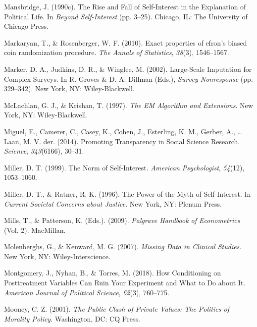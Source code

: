 \documentclass[12pt,econ]{sources/authesis}
\begin{document}
\leavevmode\hypertarget{ref-mansbridge_rise_1990}{}%
Mansbridge, J. (1990c). The Rise and Fall of Self-Interest in the Explanation of Political Life. In \emph{Beyond Self-Interest} (pp. 3--25). Chicago, IL: The University of Chicago Press.

\leavevmode\hypertarget{ref-markaryan_2010_exact}{}%
Markaryan, T., \& Rosenberger, W. F. (2010). Exact properties of efron's biased coin randomization procedure. \emph{The Annals of Statistics}, \emph{38}(3), 1546--1567.

\leavevmode\hypertarget{ref-marker_2002_large-scale}{}%
Marker, D. A., Judkins, D. R., \& Winglee, M. (2002). Large-Scale Imputation for Complex Surveys. In R. Groves \& D. A. Dillman (Eds.), \emph{Survey Nonresponse} (pp. 329--342). New York, NY: Wiley-Blackwell.

\leavevmode\hypertarget{ref-mclachlan_1997_algorithm}{}%
McLachlan, G. J., \& Krishan, T. (1997). \emph{The EM Algorithm and Extensions}. New York, NY: Wiley-Blackwell.

\leavevmode\hypertarget{ref-miguel_2014_promoting}{}%
Miguel, E., Camerer, C., Casey, K., Cohen, J., Esterling, K. M., Gerber, A., \ldots{} Laan, M. V. der. (2014). Promoting Transparency in Social Science Research. \emph{Science}, \emph{343}(6166), 30--31.

\leavevmode\hypertarget{ref-miller_norm_1999}{}%
Miller, D. T. (1999). The Norm of Self-Interest. \emph{American Psychologist}, \emph{54}(12), 1053--1060.

\leavevmode\hypertarget{ref-miller_power_1996}{}%
Miller, D. T., \& Ratner, R. K. (1996). The Power of the Myth of Self-Interest. In \emph{Current Societal Concerns about Justice}. New York, NY: Plenum Press.

\leavevmode\hypertarget{ref-mills_2009_palgrave}{}%
Mills, T., \& Patterson, K. (Eds.). (2009). \emph{Palgrave Handbook of Econometrics} (Vol. 2). MacMillan.

\leavevmode\hypertarget{ref-molenberghs_2007_missing}{}%
Molenberghs, G., \& Kenward, M. G. (2007). \emph{Missing Data in Clinical Studies}. New York, NY: Wiley-Interscience.

\leavevmode\hypertarget{ref-montgomery_1962_conditioning}{}%
Montgomery, J., Nyhan, B., \& Torres, M. (2018). How Conditioning on Posttreatment Variables Can Ruin Your Experiment and What to Do about It. \emph{American Journal of Political Science}, \emph{62}(3), 760--775.

\leavevmode\hypertarget{ref-mooney_public_2001}{}%
Mooney, C. Z. (2001). \emph{The Public Clash of Private Values: The Politics of Morality Policy}. Washington, DC: CQ Press.
\end{document}
